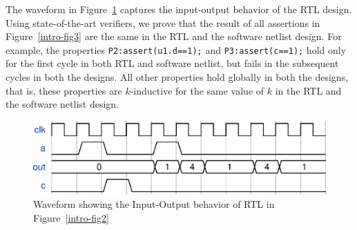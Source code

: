 The waveform in Figure~\ref{intro-waveform} captures the input-output behavior of the RTL design. 
Using state-of-the-art verifiers, we prove that the result of all assertions 
in Figure~\ref{intro-fig3} are the same in the RTL and the software netlist design. 
%
For example, the properties \texttt{P2:assert(u1.d==1);} and \texttt{P3:assert(c==1);} 
hold only for the first cycle in both RTL and software netlist, but fails in the 
subsequent cycles in both the designs.  All other properties 
hold globally in both the designs, that is, these properties are $k$-inductive 
for the same value of $k$ in the RTL and the software netlist design.
%
\begin{figure} 
\begin{center}
  \includegraphics[width=\columnwidth]{figures/example/waveform1.eps}%
	\caption{Waveform showing the Input-Output behavior of RTL in Figure~\ref{intro-fig2}}
\label{intro-waveform}
\end{center}
\end{figure}
%
